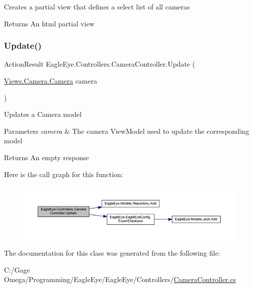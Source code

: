 Creates a partial view that defines a select list of all cameras 

\begin{DoxyReturn}{Returns}
An html partial view
\end{DoxyReturn}
\mbox{\label{class_eagle_eye_1_1_controllers_1_1_camera_controller_a9e43f7e6f051aa5dbc695d68b4b013ab}} 
\subsubsection{\texorpdfstring{Update()}{Update()}}
{\footnotesize\ttfamily Action\+Result Eagle\+Eye.\+Controllers.\+Camera\+Controller.\+Update (\begin{DoxyParamCaption}\item[{\mbox{\hyperlink{class_eagle_eye_1_1_views_1_1_camera_1_1_camera}{Views.\+Camera.\+Camera}}}]{camera }\end{DoxyParamCaption})}



Updates a Camera model 


\begin{DoxyParams}{Parameters}
{\em camera} & The camera View\+Model used to update the corresponding model\\
\hline
\end{DoxyParams}
\begin{DoxyReturn}{Returns}
An empty response
\end{DoxyReturn}
Here is the call graph for this function\+:\nopagebreak
\begin{figure}[H]
\begin{center}
\leavevmode
\includegraphics[width=350pt]{class_eagle_eye_1_1_controllers_1_1_camera_controller_a9e43f7e6f051aa5dbc695d68b4b013ab_cgraph}
\end{center}
\end{figure}


The documentation for this class was generated from the following file\+:\begin{DoxyCompactItemize}
\item 
C\+:/\+Gage Omega/\+Programming/\+Eagle\+Eye/\+Eagle\+Eye/\+Controllers/\mbox{\hyperlink{_camera_controller_8cs}{Camera\+Controller.\+cs}}\end{DoxyCompactItemize}

